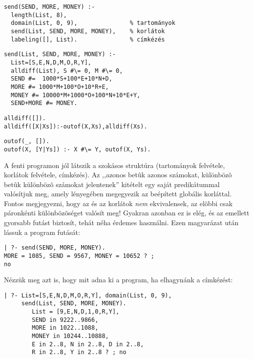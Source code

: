 \begin{verbatim}
send(SEND, MORE, MONEY) :-
  length(List, 8),
  domain(List, 0, 9),               % tartományok 
  send(List, SEND, MORE, MONEY),    % korlátok
  labeling([], List).               % címkézés
\end{verbatim}
\begin{verbatim}
send(List, SEND, MORE, MONEY) :-
  List=[S,E,N,D,M,O,R,Y], 
  alldiff(List), S #\= 0, M #\= 0,
  SEND #=  1000*S+100*E+10*N+D,
  MORE #= 1000*M+100*O+10*R+E,
  MONEY #= 10000*M+1000*O+100*N+10*E+Y,
  SEND+MORE #= MONEY.
\end{verbatim}
\begin{alltt}
% alldiff(L): L elemei mind különbözõek (buta megvalósítás).
% Lényegében azonos a beépített all_different/1 kombinatorikai globális korláttal.
alldiff([]).
alldiff([X|Xs]) :- outof(X, Xs), alldiff(Xs).
\end{alltt}
\begin{verbatim}
outof(_, []).
outof(X, [Y|Ys]) :- X #\= Y, outof(X, Ys).
\end{verbatim}

A fenti programon jól látszik a szokásos \clpfd struktúra (tartományok
felvétele, korlátok felvétele, címkézés). Az ,,azonos betûk azonos számokat,
különbözõ betûk különbözõ számokat jelentenek'' kitételt egy saját
 predikátummal valósítjuk meg, amely lényegében megegyezik
az  beépített globális korláttal. Fontos megjegyezni,
hogy az  és az  korlátok \emph{nem}
ekvivalensek, az elõbbi csak páronkénti különbözõséget valósít meg! Gyakran
azonban ez is elég, és az  emellett gyorsabb futást biztosít,
tehát néha érdemes használni. Ezen magyarázat után lássuk a program futását:

\begin{verbatim}
| ?- send(SEND, MORE, MONEY).
MORE = 1085, SEND = 9567, MONEY = 10652 ? ;
no
\end{verbatim}

Nézzük meg azt is, hogy mit adna ki a program, ha elhagynánk a címkézést:

\begin{verbatim}
| ?- List=[S,E,N,D,M,O,R,Y], domain(List, 0, 9), 
     send(List, SEND, MORE, MONEY).
        List = [9,E,N,D,1,0,R,Y],
        SEND in 9222..9866,
        MORE in 1022..1088,
        MONEY in 10244..10888,
        E in 2..8, N in 2..8, D in 2..8, 
        R in 2..8, Y in 2..8 ? ; no
\end{verbatim}

